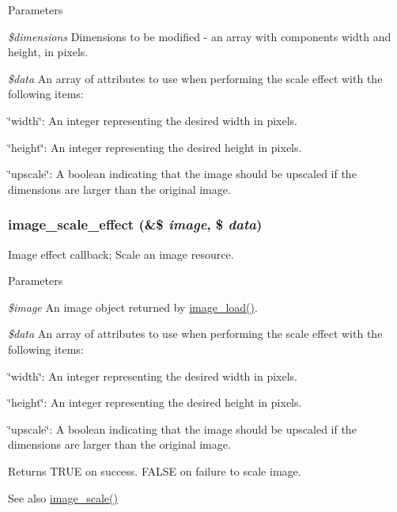 \begin{DoxyParams}{Parameters}
\item[{\em \$dimensions}]Dimensions to be modified -\/ an array with components width and height, in pixels. \item[{\em \$data}]An array of attributes to use when performing the scale effect with the following items:
\begin{DoxyItemize}
\item \char`\"{}width\char`\"{}: An integer representing the desired width in pixels.
\item \char`\"{}height\char`\"{}: An integer representing the desired height in pixels.
\item \char`\"{}upscale\char`\"{}: A boolean indicating that the image should be upscaled if the dimensions are larger than the original image. 
\end{DoxyItemize}\end{DoxyParams}
\hypertarget{image_8effects_8inc_a8884cec5b6adcc1c0728ff82043cc87a}{
\subsubsection[{image\_\-scale\_\-effect}]{\setlength{\rightskip}{0pt plus 5cm}image\_\-scale\_\-effect (\&\$ {\em image}, \/  \$ {\em data})}}
\label{image_8effects_8inc_a8884cec5b6adcc1c0728ff82043cc87a}
Image effect callback; Scale an image resource.


\begin{DoxyParams}{Parameters}
\item[{\em \$image}]An image object returned by \hyperlink{group__image_ga96098e5b039dc3906a656fa889a04776}{image\_\-load()}. \item[{\em \$data}]An array of attributes to use when performing the scale effect with the following items:
\begin{DoxyItemize}
\item \char`\"{}width\char`\"{}: An integer representing the desired width in pixels.
\item \char`\"{}height\char`\"{}: An integer representing the desired height in pixels.
\item \char`\"{}upscale\char`\"{}: A boolean indicating that the image should be upscaled if the dimensions are larger than the original image.
\end{DoxyItemize}\end{DoxyParams}
\begin{DoxyReturn}{Returns}
TRUE on success. FALSE on failure to scale image.
\end{DoxyReturn}
\begin{DoxySeeAlso}{See also}
\hyperlink{group__image_ga2eac147bb70d14d9439d6b0d54023ce3}{image\_\-scale()} 
\end{DoxySeeAlso}
